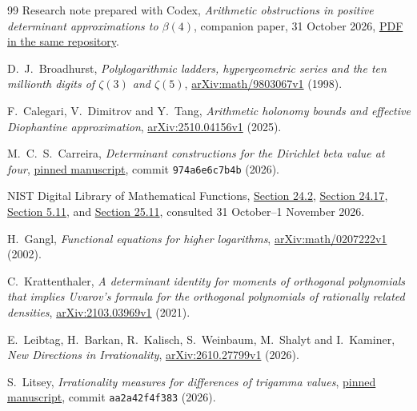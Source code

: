 \begin{thebibliography}{99}
 Research note prepared with Codex,
\emph{Arithmetic obstructions in positive determinant approximations
to $\beta(4)$}, companion paper, 31 October 2026,
\href{run:beta4-determinant-obstructions.pdf}{PDF in the same repository}.

 D.~J.~Broadhurst,
\emph{Polylogarithmic ladders, hypergeometric series and the ten millionth
digits of $\zeta(3)$ and $\zeta(5)$},
\href{https://arxiv.org/abs/math/9803067v1}{arXiv:math/9803067v1} (1998).

 F.~Calegari, V.~Dimitrov and Y.~Tang,
\emph{Arithmetic holonomy bounds and effective Diophantine approximation},
\href{https://arxiv.org/abs/2510.04156v1}{arXiv:2510.04156v1} (2025).

 M.~C.~S.~Carreira,
\emph{Determinant constructions for the Dirichlet beta value at four},
\href{https://github.com/MarcosCarreira/catalan-designs/blob/974a6e6c7b4bce67538aa1b9bf5883b931789d1f/paper/beta4_determinants.pdf}{pinned manuscript},
commit \texttt{974a6e6c7b4b} (2026).

 NIST Digital Library of Mathematical Functions,
\href{https://dlmf.nist.gov/24.2}{Section 24.2},
\href{https://dlmf.nist.gov/24.17}{Section 24.17}, \href{https://dlmf.nist.gov/5.11}{Section 5.11}, and
\href{https://dlmf.nist.gov/25.11}{Section 25.11},
consulted 31 October--1 November 2026.

 H.~Gangl,
\emph{Functional equations for higher logarithms},
\href{https://arxiv.org/abs/math/0207222v1}{arXiv:math/0207222v1} (2002).

 C.~Krattenthaler,
\emph{A determinant identity for moments of orthogonal polynomials that
implies Uvarov's formula for the orthogonal polynomials of rationally
related densities},
\href{https://arxiv.org/abs/2103.03969v1}{arXiv:2103.03969v1} (2021).

 E.~Leibtag, H.~Barkan, R.~Kalisch, S.~Weinbaum,
M.~Shalyt and I.~Kaminer, \emph{New Directions in Irrationality},
\href{https://arxiv.org/abs/2610.27799v1}{arXiv:2610.27799v1} (2026).

 S.~Litsey,
\emph{Irrationality measures for differences of trigamma values},
\href{https://github.com/slitsey/catalan-irrationality-measure/blob/aa2a42f4f3835347ad46608779e22dd52c2dc7bf/paper-lambda/lambda-irrationality.pdf}{pinned manuscript},
commit \texttt{aa2a42f4f383} (2026).


\end{thebibliography}
